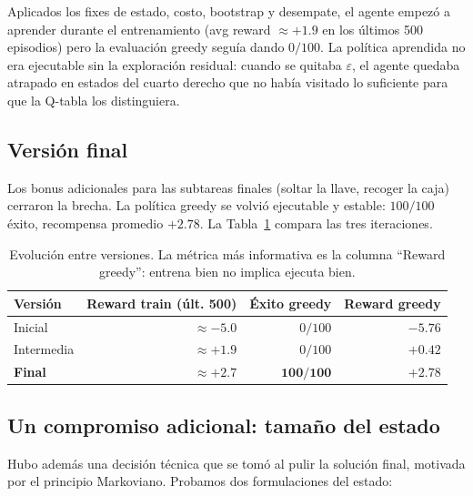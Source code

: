 \documentclass[11pt,a4paper]{article}
\begin{document}
Aplicados los fixes de estado, costo, bootstrap y desempate, el agente
empezó a aprender durante el entrenamiento (avg reward
\(\approx +1.9\) en los últimos 500 episodios) pero la evaluación
greedy seguía dando \(0/100\). La política aprendida no era ejecutable
sin la exploración residual: cuando se quitaba \(\varepsilon\), el
agente quedaba atrapado en estados del cuarto derecho que no había
visitado lo suficiente para que la Q-tabla los distinguiera.

\subsection{Versión final}

Los bonus adicionales para las subtareas finales (soltar la llave,
recoger la caja) cerraron la brecha. La política greedy se volvió
ejecutable y estable: \(100/100\) éxito, recompensa promedio
\(+2.78\). La Tabla~\ref{tab:versiones} compara las tres iteraciones.

\begin{table}[h]
  \centering
  \small
  \setlength{\extrarowheight}{2pt}
  \begin{tabular}{l r r r}
    \toprule
    \textbf{Versión} & \textbf{Reward train (últ. 500)} & \textbf{Éxito greedy} & \textbf{Reward greedy} \\
    \midrule
    Inicial      & \(\approx -5.0\) & \(0 / 100\)   & \(-5.76\) \\
    Intermedia   & \(\approx +1.9\) & \(0 / 100\)   & \(+0.42\) \\
    \textbf{Final} & \(\mathbf{\approx +2.7}\) & \(\mathbf{100 / 100}\) & \(\mathbf{+2.78}\) \\
    \bottomrule
  \end{tabular}
  \caption{Evolución entre versiones. La métrica más informativa es
  la columna ``Reward greedy'': entrena bien no implica ejecuta bien.}
  \label{tab:versiones}
\end{table}

\subsection{Un compromiso adicional: tamaño del estado}
\label{sec:proceso-compromiso}

Hubo además una decisión técnica que se tomó al pulir la solución
final, motivada por el principio Markoviano. Probamos dos
formulaciones del estado:
\end{document}
